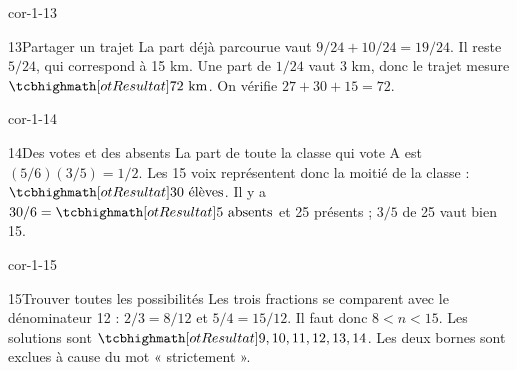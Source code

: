 \begin{blocLivre}{cor-1-13}\begin{corrige}{13}{Partager un trajet}
La part déjà parcourue vaut $9/24+10/24=19/24$. Il reste $5/24$, qui correspond à 15 km. Une part de $1/24$ vaut 3 km, donc le trajet mesure $\res{72\text{ km}}$. On vérifie $27+30+15=72$.
\end{corrige}\end{blocLivre}
\begin{blocLivre}{cor-1-14}\begin{corrige}{14}{Des votes et des absents}
La part de toute la classe qui vote A est $(5/6)(3/5)=1/2$. Les 15 voix représentent donc la moitié de la classe : $\res{30\text{ élèves}}$. Il y a $30/6=\res{5\text{ absents}}$ et 25 présents ; $3/5$ de 25 vaut bien 15.
\end{corrige}\end{blocLivre}
\begin{blocLivre}{cor-1-15}\begin{corrige}{15}{Trouver toutes les possibilités}
Les trois fractions se comparent avec le dénominateur 12 : $2/3=8/12$ et $5/4=15/12$. Il faut donc $8<n<15$. Les solutions sont $\res{9,10,11,12,13,14}$. Les deux bornes sont exclues à cause du mot « strictement ».
\end{corrige}\end{blocLivre}
